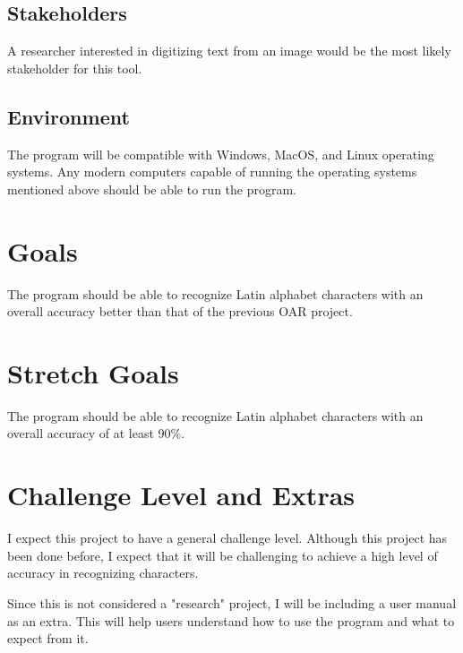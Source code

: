 \documentclass{article}
\begin{document}
\subsection{Stakeholders}

A researcher interested in digitizing text from an image would be the most
likely stakeholder for this tool.

\subsection{Environment}

The program will be compatible with Windows, MacOS, and Linux operating systems.
Any modern computers capable of running the operating systems mentioned above
should be able to run the program.

\section{Goals}

The program should be able to recognize Latin alphabet characters with an
overall accuracy better than that of the previous OAR project.

\section{Stretch Goals}

The program should be able to recognize Latin alphabet characters with an
overall accuracy of at least 90\%.

\section{Challenge Level and Extras}

I expect this project to have a general challenge level. Although this project
has been done before, I expect that it will be challenging to achieve a high
level of accuracy in recognizing characters.

Since this is not considered a "research" project, I will be including a user
manual as an extra. This will help users understand how to use the program and
what to expect from it.
\end{document}
